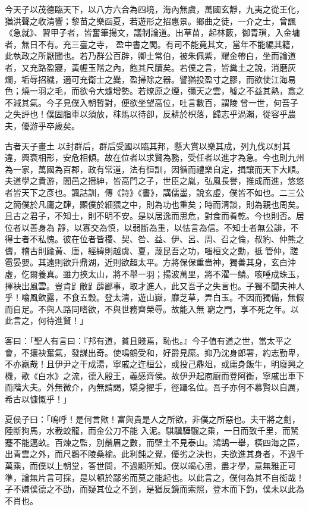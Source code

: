 \begin{pinyinscope}
 今天子以茂德臨天下，以八方六合為四境，海內無虞，萬國玄靜，九夷之從王化，猶洪聲之收清響；黎苗之樂函夏，若遊形之招惠景。鄉曲之徒，一介之士，曾諷《急就》、習甲子者，皆奮筆揚文，議制論道。出草苗，起林藪，御青瑣，入金墉者，無日不有。充三臺之寺，
 盈中書之閣。有司不能竟其文，當年不能編其籍，此執政之所厭聞也。若乃群公百辟，卿士常伯，被朱佩紫，耀金帶白，坐而論道者，又充路盈寢，黃幄玉階之內，飽其尺牘矣。若僕之言，皆糞土之說，消磨灰爛，垢辱招穢，適可充衛士之爨，盈掃除之器。譬猶投盈寸之膠，而欲使江海易色；燒一羽之毛，而欲令大爐增勢。若燎原之煙，彌天之雲，噓之不益其熱，翕之不減其氣。今子見僕入朝暫對，便欲坐望高位，吐言數百，謂陵曾一世，何吾子之失評也！僕固脂車以須放，秣馬以待卻，反耕於枳落，歸志乎渦瀨，從容乎農夫，優游乎卒歲矣。



 古者天子畫土
 以封群后，群后受國以臨其邦，懸大賞以樂其成，列九伐以討其違，興衰相形，安危相傾。故在位者以求賢為務，受任者以進才為急。今也則九州為一家，萬國為百郡，政有常道，法有恒訓，因循而禮樂自定，揖讓而天下大順。夫道學之貴游，閭邑之搢紳，皆高門之子，世臣之胤，弘風長譽，推成而進，悠悠者皆天下之彥也。諷詁訓，傳《詩》《書》，講儒墨，說玄虛，僕皆不如也。二三公之簡僕於凡庸之肆，顯僕於細猥之中，則為功也重矣；時而清談，則為親也周矣。且古之君子，不知士，則不明不安。是以居逸而思危，對食而肴乾。今也則否。居位者以善身為
 靜，以寡交為慎，以弱斷為重，以怯言為信。不知士者無公誹，不得士者不私愧。彼在位者皆稷、契、咎、益、伊、呂、周、召之倫，叔豹、仲熊之儔，稽古則踰黃、唐，經緯則越虞、夏，蔑昆吾之功，嗤桓文之勳，抵管仲，蹉雹晏嬰。其遠則欲升鼎湖，近則欲超太平。方將保保重嗇神，獨善其身，玄白沖虛，仡爾養真。雖力挾太山，將不舉一羽；揚波萬里，將不濯一鱗。咳唾成珠玉，揮袂出風雲。豈肯𧾷敝𧾷薜鄙事，取才進人，此又吾子之失言也。子獨不聞夫神人乎！噏風飲露，不食五穀。登太清，遊山嶽，靡芝草，弄白玉。不因而獨備，無假而自足。不與人路同嗜欲，不與世務齊榮辱。故能入無
 窮之門，享不死之年。以此言之，何待進賢！」



 客曰：「聖人有言曰：『邦有道，貧且賤焉，恥也。』今子值有道之世，當太平之會，不攘袂奮氣，發謀出奇。使鳴鶴受和，好爵見縻。抑乃沈身郎署，約志勤卑，不亦羸哉！且伊尹之干成湯，寧戚之迕桓公，或投己鼎俎，或庸身飯牛，明廢興之機，歌《白水》之流，德入殷王，義感齊侯。故伊尹起庖廚而登阿衡，寧戚出車下而階大夫。外無微介，內無請謁，矯身擢手，徑躡名位。吾子亦何不慕賢以自厲，希古以慷慨乎！」



 夏侯子曰：「嗚呼！是何言歟！富與貴是人之所欲，非僕之所惡也。夫干將之劍，陸斷狗馬，水截蛟龍，而金公刀不能
 入泥。騏驥驊騮之乘，一日而致千里，而駑蹇不能邁畝。百煉之監，別鬚眉之數，而壁土不見泰山。鴻鵠一舉，橫四海之區，出青雲之外，而尺鷃不陵桑榆。此利鈍之覺，優劣之決也，夫欲進其身者，不過千萬乘，而僕以上朝堂，答世問，不過顯所知。僕以竭心思，盡才學，意無雅正可準，論無片言可採，是以頓於鄙劣而莫之能起也。以此言之，僕何為其不自衒哉！子不嫌僕德之不劭，而疑其位之不到，是猶反鏡而索照，登木而下釣，僕未以此為不肖也。




\end{pinyinscope}
